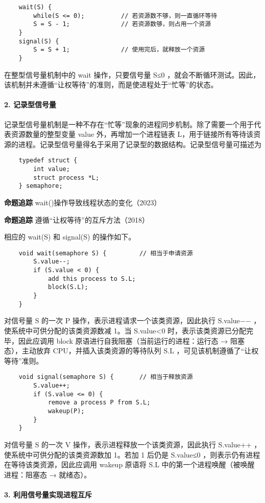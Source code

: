 \documentclass{ctexbook}
\begin{document}
	\begin{lstlisting}
	wait(S) {
		while(S <= 0);          // 若资源数不够，则一直循环等待
		S = S - 1;              // 若资源数够，则占用一个资源
	}
	signal(S) {
		S = S + 1;              // 使用完后，就释放一个资源
	}
	\end{lstlisting}
	在整型信号量机制中的 wait 操作，只要信号量 S≤0 ，就会不断循环测试。因此，该机制并未遵循“让权等待”的准则，而是使进程处于“忙等”的状态。
	
	\paragraph{2. 记录型信号量}
	
	记录型信号量机制是一种不存在“忙等”现象的进程同步机制。除了需要一个用于代表资源数量的整型变量 value 外，再增加一个进程链表 L，用于链接所有等待该资源的进程。记录型信号量得名于采用了记录型的数据结构。记录型信号量可描述为
	\begin{lstlisting}
	typedef struct {
		int value;
		struct process *L;
	} semaphore;
\end{lstlisting}

	\textbf{命题追踪} wait()操作导致线程状态的变化（2023）
	
	\textbf{命题追踪} 遵循“让权等待”的互斥方法（2018）
	
	相应的 wait(S) 和 signal(S) 的操作如下。
	\begin{lstlisting}
	void wait(semaphore S) {         // 相当于申请资源
		S.value--;
		if (S.value < 0) {
			add this process to S.L;
			block(S.L);
		}
	}
\end{lstlisting}
	对信号量 S 的一次 P 操作，表示进程请求一个该类资源，因此执行 S.value−− ，使系统中可供分配的该类资源数减 1。当 S.value<0 时，表示该类资源已分配完毕，因此应调用 block 原语进行自我阻塞（当前运行的进程：运行态 → 阻塞态），主动放弃 CPU，并插入该类资源的等待队列 S.L ，可见该机制遵循了“让权等待”准则。
	\begin{lstlisting}
	void signal(semaphore S) {       // 相当于释放资源
		S.value++;
		if (S.value <= 0) {
			remove a process P from S.L;
			wakeup(P);
		}
	}
\end{lstlisting}

	对信号量 S 的一次 V 操作，表示进程释放一个该类资源，因此执行 S.value++ ，使系统中可供分配的该类资源数加 1。若加 1 后仍是 S.value≤0 ，则表示仍有进程在等待该类资源，因此应调用 wakeup 原语将 S.L 中的第一个进程唤醒（被唤醒进程：阻塞态 → 就绪态）。
	
	\paragraph{3. 利用信号量实现进程互斥}
	
\end{document}
